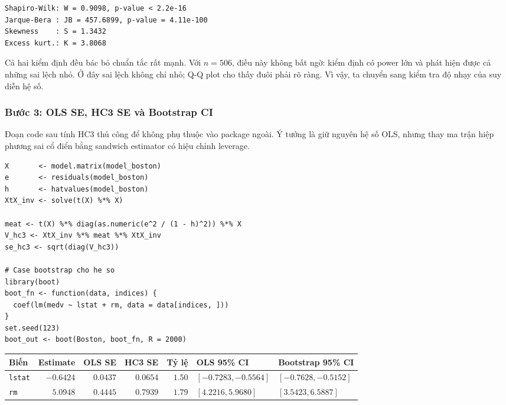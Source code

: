 \begin{lstlisting}[style=output]
Shapiro-Wilk: W = 0.9098, p-value < 2.2e-16
Jarque-Bera : JB = 457.6899, p-value = 4.11e-100
Skewness    : S = 1.3432
Excess kurt.: K = 3.8068
\end{lstlisting}

Cả hai kiểm định đều bác bỏ chuẩn tắc rất mạnh. Với $n=506$, điều này không bất ngờ: kiểm định có power lớn và phát hiện được cả những sai lệch nhỏ. Ở đây sai lệch không chỉ nhỏ; Q-Q plot cho thấy đuôi phải rõ ràng. Vì vậy, ta chuyển sang kiểm tra độ nhạy của suy diễn hệ số.

\subsubsection*{Bước 3: OLS SE, HC3 SE và Bootstrap CI}

Đoạn code sau tính HC3 thủ công để không phụ thuộc vào package ngoài. Ý tưởng là giữ nguyên hệ số OLS, nhưng thay ma trận hiệp phương sai cổ điển bằng sandwich estimator có hiệu chỉnh leverage.

\begin{lstlisting}[style=Rstyle]
X       <- model.matrix(model_boston)
e       <- residuals(model_boston)
h       <- hatvalues(model_boston)
XtX_inv <- solve(t(X) %*% X)

meat <- t(X) %*% diag(as.numeric(e^2 / (1 - h)^2)) %*% X
V_hc3 <- XtX_inv %*% meat %*% XtX_inv
se_hc3 <- sqrt(diag(V_hc3))

# Case bootstrap cho he so
library(boot)
boot_fn <- function(data, indices) {
  coef(lm(medv ~ lstat + rm, data = data[indices, ]))
}
set.seed(123)
boot_out <- boot(Boston, boot_fn, R = 2000)
\end{lstlisting}

\begin{center}
\scriptsize
\begin{tabularx}{\textwidth}{@{}lrrrr>{\raggedright\arraybackslash}X>{\raggedright\arraybackslash}X@{}}
\toprule
\textbf{Biến} & \textbf{Estimate} & \textbf{OLS SE} & \textbf{HC3 SE} & \textbf{Tỷ lệ} & \textbf{OLS 95\% CI} & \textbf{Bootstrap 95\% CI} \\
\midrule
\texttt{lstat} & $-0.6424$ & $0.0437$ & $0.0654$ & $1.50$ & $[-0.7283, -0.5564]$ & $[-0.7628, -0.5152]$ \\
\texttt{rm}    & $ 5.0948$ & $0.4445$ & $0.7939$ & $1.79$ & $[4.2216, 5.9680]$ & $[3.5423, 6.5887]$ \\
\bottomrule
\end{tabularx}
\end{center}

